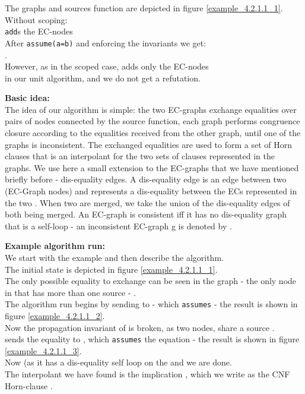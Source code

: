 The graphs and sources function are depicted in figure \ref{example_4.2.1.1_1}.\\
Without scoping:\\
 \lstinline|add|s the EC-nodes \\
After \lstinline|assume(a=b)| and enforcing the invariants we get:\\
.\\
However, as \m{\textcolor{red}{x} \notin \langb} in the scoped case,  adds only the EC-nodes\\
\s{[a,b],[c],[d]} in our unit algorithm, and we do not get a refutation.

\textbf{Basic idea:}\\
The idea of our algorithm is simple: the two EC-graphs exchange equalities over pairs of nodes connected by the source function,
each graph performs congruence closure according to the equalities received from the other graph, until one of the graphs is inconsistent. The exchanged equalities are used to form a set of Horn clauses that is an interpolant for the two sets of clauses represented in the graphs.
We use here a small extension to the EC-graphs that we have mentioned briefly before - dis-equality edges.
A dis-equality edge is an edge between two \GTs{} (EC-Graph nodes) and represents a dis-equality between the ECs represented in the two \GTs{}. When two \GTs{} are merged, we take the union of the dis-equality edges of both \GTs{} being merged. An EC-graph is consistent iff it has no dis-equality graph that is a self-loop - an inconsistent EC-graph g is denoted by .

\noindent
\textbf{Example algorithm run:}\\
We start with the example and then describe the algorithm.\\
The initial state is depicted in figure \ref{example_4.2.1.1_1}.\\
The only possible equality to exchange can be seen in the graph - the only node in  that has more than one source - .\\
The algorithm run begins by  sending  to  - which  \lstinline{assumes} - the result is shown in figure \ref{example_4.2.1.1_2}.\\
Now the propagation invariant of  is broken, as two nodes,  share a source . \\
 sends the equality  to , which \lstinline|assumes| the equation - the result is shown in figure \ref{example_4.2.1.1_3}.\\
Now  (as it has a dis-equality self loop on the \GT{}  and we are done.\\
The interpolant we have found is the implication , which we write as the CNF Horn-clause .

